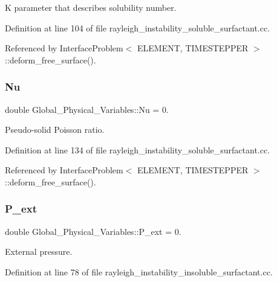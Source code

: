 K parameter that describes solubility number. 



Definition at line 104 of file rayleigh\+\_\+instability\+\_\+soluble\+\_\+surfactant.\+cc.



Referenced by Interface\+Problem$<$ E\+L\+E\+M\+E\+N\+T, T\+I\+M\+E\+S\+T\+E\+P\+P\+E\+R $>$\+::deform\+\_\+free\+\_\+surface().

\mbox{\label{namespaceGlobal__Physical__Variables_a3962c36313826b19f216f6bbbdd6a477}} 
\subsubsection{\texorpdfstring{Nu}{Nu}}
{\footnotesize\ttfamily double Global\+\_\+\+Physical\+\_\+\+Variables\+::\+Nu = 0.}



Pseudo-\/solid Poisson ratio. 



Definition at line 134 of file rayleigh\+\_\+instability\+\_\+soluble\+\_\+surfactant.\+cc.



Referenced by Interface\+Problem$<$ E\+L\+E\+M\+E\+N\+T, T\+I\+M\+E\+S\+T\+E\+P\+P\+E\+R $>$\+::deform\+\_\+free\+\_\+surface().

\mbox{\label{namespaceGlobal__Physical__Variables_a0406c0cbd463d1df2458fe5de98a00eb}} 
\subsubsection{\texorpdfstring{P\+\_\+ext}{P\_ext}}
{\footnotesize\ttfamily double Global\+\_\+\+Physical\+\_\+\+Variables\+::\+P\+\_\+ext = 0.}



External pressure. 



Definition at line 78 of file rayleigh\+\_\+instability\+\_\+insoluble\+\_\+surfactant.\+cc.



